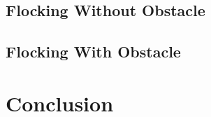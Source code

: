 \documentclass[journal]{IEEEtran}
\begin{document}
					      \subsection{Flocking Without Obstacle}

					      \subsection{Flocking With Obstacle}
					      \section{Conclusion}




\end{document}
